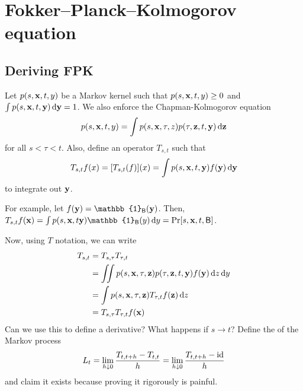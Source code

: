 \documentclass[notes]{agony}
\newcommand{\rv}{\mathsf}
\newcommand{\B}{\rv{B}}
\newcommand{\x}{\vb{x}}
\newcommand{\y}{\vb{y}}
\begin{document}
\chapter{Fokker--Planck--Kolmogorov equation}

\section{Deriving FPK}

Let $p(s,\x,t,y)$ be a Markov kernel
such that $p(s,\x,t,y) \geq 0$ and $\int p(s,\x,t,\y) \dd{\y} = 1$.
We also enforce the Chapman-Kolmogorov equation
\[ p(s,\x,t,y) = \int p(s,\x,\tau,z)p(\tau,\vb z,t,\y)\dd{\vb z} \]
for all $s < \tau < t$.
Also, define an operator $T_{s,t}$ such that
\[ T_{s,t}f(x) = [T_{s,t}(f)](x) = \int p(s,\x,t,\y)f(\y)\dd{\y} \]
to integrate out $\y$.

For example, let $f(\y) = \mathbb{1}_{\B}(\y)$.
Then, $T_{s,t}f(\x) = \int p(s,\x,t\y)\mathbb{1}_{\B}(y)\dd{y} = \Pr[s,\x,t,\B]$.

Now, using $T$ notation, we can write
\begin{align*}
	T_{s,t} & = T_{s,\tau}T_{\tau,t}                                        \\
	        & = \iint p(s,\x,\tau,\vb z)p(\tau,\vb z,t,\y)f(\y)\dd{z}\dd{y} \\
	        & = \int p(s,\x,\tau,\vb z) T_{\tau,t}f(\vb z) \dd{z}           \\
	        & = T_{s,\tau}T_{\tau,t} f(\x)
\end{align*}
Can we use this to define a derivative?
What happens if $s \to t$?
Define the  of the Markov process
\begin{align*}
	L_t = \lim_{h \downarrow 0} \frac{T_{t,t+h} - T_{t,t}}{h}
	= \lim_{h\downarrow 0} \frac{T_{t,t+h} - \operatorname{id}}{h}
\end{align*}
and claim it exists because proving it rigorously is painful.
\end{document}
